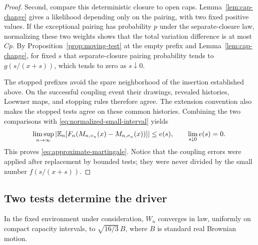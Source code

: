 \begin{proof}
Second, compare this deterministic closure to open caps.
Lemma~\ref{lem:cap-change} gives a likelihood depending only on
the pairing, with two fixed positive values.  If the exceptional
pairing has probability $p$ under the separate-closure law,
normalizing these two weights
shows that the total variation difference is at most $C p$.
By Proposition~\ref{prop:moving-test} at the empty prefix and
Lemma~\ref{lem:cap-change}, for fixed $s$ that separate-closure
pairing probability tends to
$g(s/(x+s))$, which tends to zero as $s\downarrow0$.

The stopped prefixes avoid the spare neighborhood of the
insertion established above.  On the successful coupling event
their drawings, revealed histories, Loewner maps, and stopping
rules therefore agree.  The extension convention also makes
the stopped tests agree on these common histories.  Combining the two comparisons with
\eqref{eq:normalized-small-interval} yields
\[
 \limsup_{n\to\infty}
 \left|\mathbb E_n\!\left[
 F_n(M_{n,\upsilon_n}(x)-M_{n,\sigma_n}(x))\right]\right|
 \le e(s),\qquad \lim_{s\downarrow0}e(s)=0.
\]
This proves \eqref{eq:approximate-martingale}.  Notice that the
coupling errors were applied after replacement by bounded tests;
they were never divided by the small number $f(s/(x+s))$.
\end{proof}

\subsection{Two tests determine the driver}

\begin{proposition}
\label{prop:driving-convergence}
In the fixed environment under consideration, $W_n$ converges in
law, uniformly on compact capacity intervals, to
$\sqrt{16/3}\,B$, where $B$ is standard real Brownian motion.
\end{proposition}

